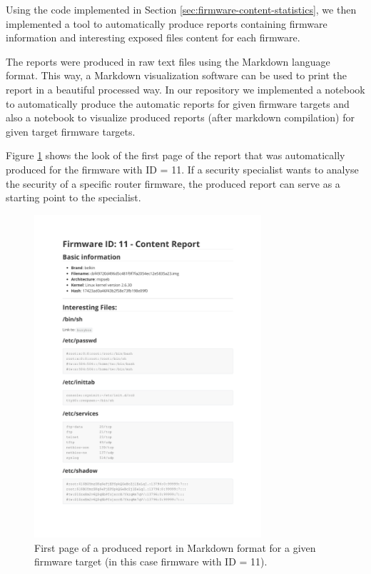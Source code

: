 Using the code implemented in Section \ref{sec:firmware-content-statistics}, we then implemented a tool to automatically produce reports containing firmware information and interesting exposed files content for each firmware.

The reports were produced in raw text files using the Markdown language format. This way, a Markdown visualization software can be used to print the report in a beautiful processed way. In our repository \cite{github:c2dc-toso} we implemented a notebook to automatically produce the automatic reports for given firmware targets and also a notebook to visualize produced reports (after markdown compilation) for given target firmware targets.

Figure \ref{fig:automatic-report} shows the look of the first page of the report that was automatically produced for the firmware with ID = 11. If a security specialist wants to analyse the security of a specific router firmware, the produced report can serve as a starting point to the specialist.

\begin{figure}[H]
    \centering
    \includegraphics[width=0.75\textwidth]{figs/REPORT2.png}
    \caption{First page of a produced report in Markdown format for a given firmware target (in this case firmware with ID = 11).}
    \label{fig:automatic-report}
\end{figure}

